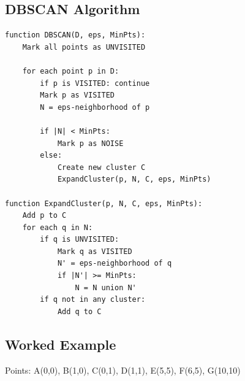 \subsection{DBSCAN Algorithm}

\begin{algorithmbox}[DBSCAN]
\begin{lstlisting}[language=pseudo]
function DBSCAN(D, eps, MinPts):
    Mark all points as UNVISITED

    for each point p in D:
        if p is VISITED: continue
        Mark p as VISITED
        N = eps-neighborhood of p

        if |N| < MinPts:
            Mark p as NOISE
        else:
            Create new cluster C
            ExpandCluster(p, N, C, eps, MinPts)

function ExpandCluster(p, N, C, eps, MinPts):
    Add p to C
    for each q in N:
        if q is UNVISITED:
            Mark q as VISITED
            N' = eps-neighborhood of q
            if |N'| >= MinPts:
                N = N union N'
        if q not in any cluster:
            Add q to C
\end{lstlisting}
\end{algorithmbox}

\subsection{Worked Example}

\begin{examplebox}[DBSCAN με $\varepsilon=2$, MinPts=3]
Points: A(0,0), B(1,0), C(0,1), D(1,1), E(5,5), F(6,5), G(10,10)
\end{examplebox}

